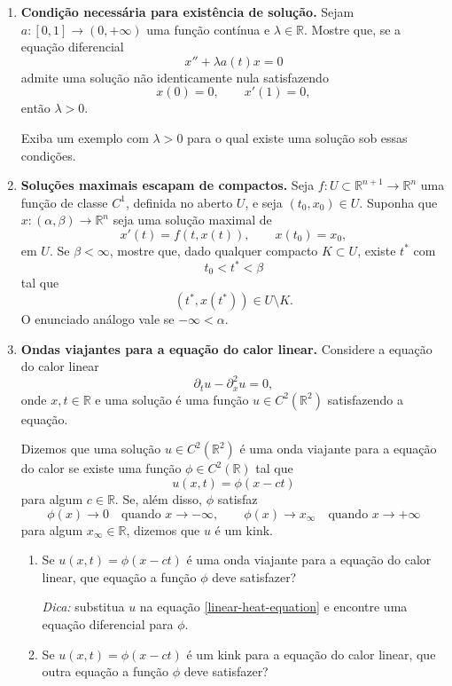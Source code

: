 \documentclass[a4paper,11pt,reqno]{amsart}
\begin{document}
\begin{enumerate}
\item \textbf{Condição necessária para existência de solução.}
Sejam $a:[0,1]\to(0,+\infty)$ uma função contínua e $\lambda\in\mathbb{R}$. Mostre que, se a equação diferencial
\[
    x''+\lambda a(t)x=0
\]
admite uma solução não identicamente nula satisfazendo
\[
    x(0)=0,
    \qquad
    x'(1)=0,
\]
então $\lambda>0$.

Exiba um exemplo com $\lambda>0$ para o qual existe uma solução sob essas condições.


\item \textbf{Soluções maximais escapam de compactos.}
Seja $f:U\subset\mathbb{R}^{n+1}\to\mathbb{R}^n$ uma função de classe $C^1$, definida no aberto $U$, e seja $(t_0,x_0)\in U$.
Suponha que $x:(\alpha,\beta)\to\mathbb{R}^n$ seja uma solução maximal de
\[
    x'(t)=f(t,x(t)),
    \qquad
    x(t_0)=x_0,
\]
em $U$.
Se $\beta<\infty$, mostre que, dado qualquer compacto $K\subset U$, existe $t^*$ com
\[
    t_0<t^*<\beta
\]
tal que
\[
    (t^*,x(t^*))\in U\setminus K.
\]
O enunciado análogo vale se $-\infty<\alpha$.


\item \textbf{Ondas viajantes para a equação do calor linear.}
Considere a equação do calor linear
\begin{equation}\label{linear-heat-equation}
    \partial_t u-\partial_x^2u=0,
\end{equation}
onde $x,t\in\mathbb{R}$ e uma solução é uma função $u\in C^2(\mathbb{R}^2)$ satisfazendo a equação.

Dizemos que uma solução $u\in C^2(\mathbb{R}^2)$ é uma onda viajante para a equação do calor se existe uma função $\phi\in C^2(\mathbb{R})$ tal que
\[
    u(x,t)=\phi(x-ct)
\]
para algum $c\in\mathbb{R}$. Se, além disso, $\phi$ satisfaz
\[
    \phi(x)\to 0
    \quad\text{quando }x\to-\infty,
    \qquad
    \phi(x)\to x_\infty
    \quad\text{quando }x\to+\infty
\]
para algum $x_\infty\in\mathbb{R}$, dizemos que $u$ é um kink.

\begin{enumerate}
    \item Se $u(x,t)=\phi(x-ct)$ é uma onda viajante para a equação do calor linear, que equação a função $\phi$ deve satisfazer?

    \emph{Dica:} substitua $u$ na equação \eqref{linear-heat-equation} e encontre uma equação diferencial para $\phi$.

    \item Se $u(x,t)=\phi(x-ct)$ é um kink para a equação do calor linear, que outra equação a função $\phi$ deve satisfazer?


\end{enumerate}
\end{enumerate}
\end{document}

